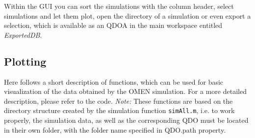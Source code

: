 			Within the \gls{GUI} you can sort the simulations with the column header, select simulations and let them plot, open the directory of a simulation or 
			even export a selection, which is available as an \gls{QDOA} in the main workspace entitled {\it ExportedDB}.

		\subsection{Plotting} \label{sec:plotting}
			Here follows a short description of functions, which can be used for basic visualization of the data obtained by the OMEN simulation. 
			For a more detailed description, please refer to the code.
			\textit{Note:}
			These functions are based on the directory structure created by the simulation function \lstinline{simAll.m}, i.e. to work properly, the simulation data, 
			as well as the corresponding \gls{QDO} must be located in their own folder, with the folder name specified in QDO.path property.
			
